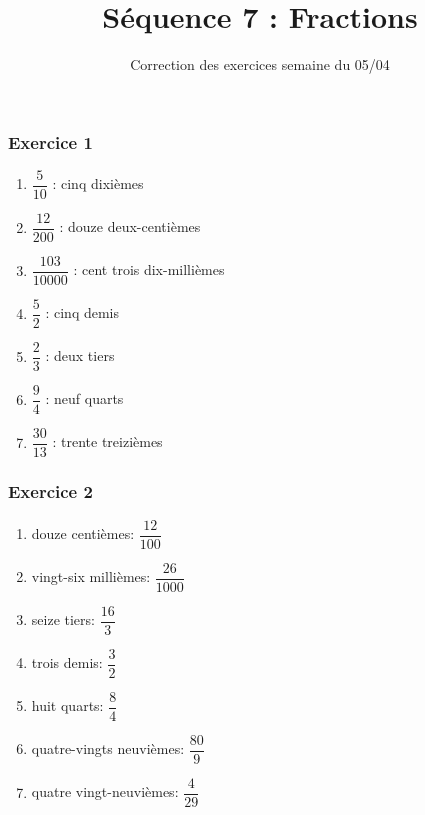 \documentclass[xcolor={dvipsnames}]{beamer}
\title{Séquence 7 : Fractions}
\subtitle{Correction des exercices semaine du 05/04}
\begin{document}
\begin{frame}
  \titlepage 
\end{frame}

	
\begin{frame}
	\frametitle{Exercice 1}
	\begin{enumerate}[a]
		\item $\dfrac{5}{10}$ : \pause  cinq dixièmes
		\item $\dfrac{12}{200}$ : \pause  douze deux-centièmes
		\item $\dfrac{103}{10000}$ : \pause  cent trois dix-millièmes
		\item $\dfrac{5}{2}$ : \pause  cinq demis
		\item $\dfrac{2}{3}$ : \pause  deux tiers
		\item $\dfrac{9}{4}$ : \pause  neuf quarts
		\item $\dfrac{30}{13}$ : \pause  trente treizièmes
	\end{enumerate}
\end{frame}


\begin{frame}
	\frametitle{Exercice 2}
	\begin{enumerate}[a]
		\item douze centièmes: \pause  $\dfrac{12}{100}$
		\item vingt-six millièmes: \pause  $\dfrac{26}{1000}$
		\item seize tiers: \pause  $\dfrac{16}{3}$
		\item trois demis: \pause  $\dfrac{3}{2}$
		\item huit quarts: \pause  $\dfrac{8}{4}$
		\item quatre-vingts neuvièmes: \pause  $\dfrac{80}{9}$
		\item quatre vingt-neuvièmes: \pause  $\dfrac{4}{29}$
	\end{enumerate}
\end{frame}
\end{document}
